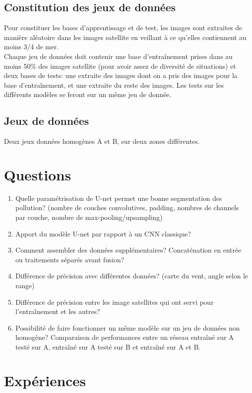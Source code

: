 \documentclass{article}
\begin{document}
\subsection{Constitution des jeux de données}
Pour constituer les bases d'apprentissage et de test, les images sont extraites de manière aléatoire dans les images satellite en veillant à ce qu'elles contiennent au moins 3/4 de mer.\\
Chaque jeu de données doit contenir une base d'entraînement prises dans au moins 50\% des images satellite (pour avoir assez de diversité de situations) et deux bases de tests: une extraite des images dont on a pris des images pour la base d'entraînement, et une extraite du reste des images. Les tests sur les différents modèles se feront sur un même jeu de donnée.

\subsection{Jeux de données}
Deux jeux données homogènes A et B, sur deux zones différentes.

\section{Questions}

\begin{enumerate}
\item Quelle paramétrisation de U-net permet une bonne segmentation des pollution? (nombre de couches convolutives, padding, nombres de channels par couche, nombre de max-pooling/upsampling)
\item Apport du modèle U-net par rapport à un CNN classique?
\item Comment assembler des données supplémentaires? Concaténation en entrée ou traitements séparés avant fusion? 
\item Différence de précision avec différentes données? (carte du vent, angle selon le range)
\item Différence de précision entre les image satellites qui ont servi pour l'entraînement et les autres?
\item Possibilité de faire fonctionner un même modèle sur un jeu de données non homogène? Comparaison de performances entre un réseau entraîné sur A testé sur A, entraîné sur A testé sur B et entraîné sur A et B.
\end{enumerate}

\section{Expériences}
\end{document}
